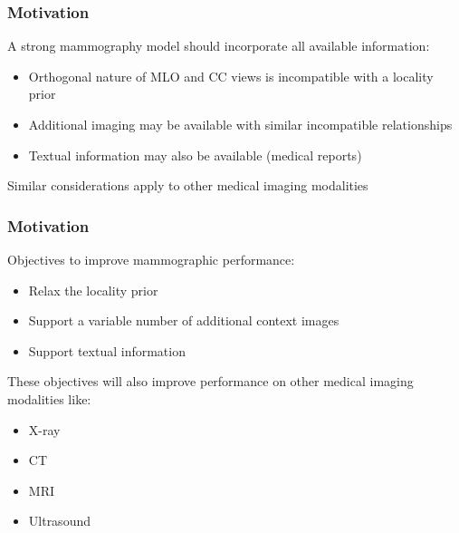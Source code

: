 \documentclass{beamer}
\begin{document}
\begin{frame}
   \frametitle{Motivation}
   A strong mammography model should incorporate all available information:
   \begin{itemize}
        \item Orthogonal nature of MLO and CC views is incompatible with a locality prior
        \item Additional imaging may be available with similar incompatible relationships
        \item Textual information may also be available (medical reports)
   \end{itemize}
   \vspace{1em}
   Similar considerations apply to other medical imaging modalities
\end{frame}

\begin{frame}
   \frametitle{Motivation}
   Objectives to improve mammographic performance:
   \begin{itemize}
        \item Relax the locality prior
        \item Support a variable number of additional context images
        \item Support textual information
   \end{itemize}
   \vspace{1em}
   These objectives will also improve performance on other medical imaging modalities like:
   \begin{itemize}
        \item X-ray
        \item CT
        \item MRI
        \item Ultrasound
   \end{itemize}
\end{frame}
\end{document}
